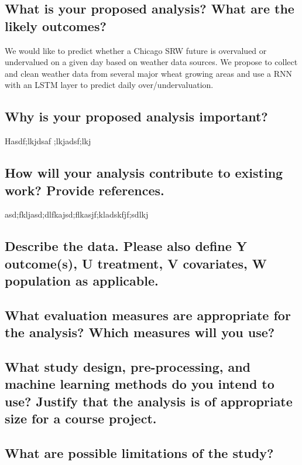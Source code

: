 \documentclass[twoside,11pt]{article}
\begin{document}
\subsection{What is your proposed analysis? What are the likely outcomes?}

We would like to predict whether a Chicago SRW future is overvalued or undervalued on a given day based on weather data sources. We propose to collect and clean weather data from several major wheat growing areas and use a RNN with an LSTM layer to predict daily over/undervaluation.  

\subsection{Why is your proposed analysis important?}

Hasdf;lkjdsaf ;lkjadsf;lkj


\subsection{How will your analysis contribute to existing work? Provide references.}

asd;fkljasd;dlfkajsd;flkasjf;kladskfjf;sdlkj

\subsection{Describe the data. Please also define Y outcome(s), U treatment, V covariates, W population as applicable.}


\subsection{What evaluation measures are appropriate for the analysis? Which measures will you use?}


\subsection{What study design, pre-processing, and machine learning methods do you intend to use? Justify that the analysis is of appropriate size for a course project.}


\subsection{What are possible limitations of the study?}



\end{document}
